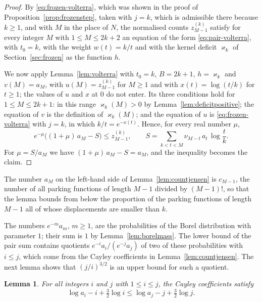 \documentclass{amsart}
\makeatletter
\newtheorem{lemma}[theorem]{Lemma}
\theoremstyle{definition}
\theoremstyle{remark}
\numberwithin{equation}{section}
\def\subsection{\@startsection{subsection}{2}\z@{.5\linespacing\@plus.7\linespacing}{-.5em}{\normalfont\bfseries\boldmath}}
\makeatother
\begin{document}
\begin{proof}
By \eqref{eq:frozen-volterra}, which was shown in the proof of
Proposition~\ref{prop:frozenstep}, taken with $j=k$, which is admissible
there because $k\ge1$, and with $M$ in the place of $N$, the normalised counts
$z^{(k)}_{M-1}$ satisfy for every integer $M$ with $1\le M\le2k+2$ an
equation of the form \eqref{eq:pair-volterra}, with $t_0=k$, with the
weight $w(t)=k/t$ and with the kernel deficit $\varkappa_k$ of
Section~\ref{sec:frozen} as the function $h$.

We now apply Lemma~\ref{lem:volterra} with $t_0=k$, $B=2k+1$,
$h=\varkappa_k$ and $v(M)=a_M$, with $u(M)=z^{(k)}_{M-1}$ for $M\ge1$ and
with $x(t)=\log(t/k)$ for $t\ge1$; the values of $u$ and $x$ at $0$ do not
enter. Its three conditions hold for $1\le M\le2k+1$: in this range
$\varkappa_k(M)>0$ by Lemma~\ref{lem:deficitpositive}; the equation of $v$
is the definition of $\varkappa_k(M)$; and the equation of $u$ is
\eqref{eq:frozen-volterra} with $j=k$, in which $k/t=e^{-x(t)}$. Hence,
for every real number $\mu$,
\[
e^{-\mu}\bigl((1+\mu)\,a_M-S\bigr)\le z^{(k)}_{M-1},\qquad
S=\sum_{k<t<M}\nu_{M-t}\,a_t\,\log\frac tk.
\]
For $\mu=S/a_M$ we have $(1+\mu)\,a_M-S=a_M$, and the inequality becomes the
claim.
\end{proof}

The number $a_M$ on the left-hand side of Lemma~\ref{lem:countjensen} is
$c_{M-1}$, the number of all parking functions of length $M-1$ divided by
$(M-1)!$, so that the lemma bounds from below the proportion of the parking
functions of length $M-1$ all of whose displacements are smaller than $k$.

\subsection{The Borel distribution}\label{subsec:pair-borel}

The numbers $e^{-m}a_m$, $m\ge1$, are the probabilities of the Borel
distribution with parameter $1$; their sum is $1$ by
Lemma~\ref{lem:borelmass}. The lower bound of the pair sum contains
quotients $e^{-i}a_i/(e^{-j}a_j)$ of two of these probabilities with
$i\le j$, which come from the Cayley coefficients in
Lemma~\ref{lem:countjensen}. The next lemma shows that $(j/i)^{3/2}$ is an
upper bound for such a quotient.

\begin{lemma}\label{lem:borelmonotone}
For all integers $i$ and $j$ with $1\le i\le j$, the Cayley coefficients
satisfy
\[
\log a_i-i+\tfrac32\log i\le\log a_j-j+\tfrac32\log j.
\]
\end{lemma}
\end{document}
